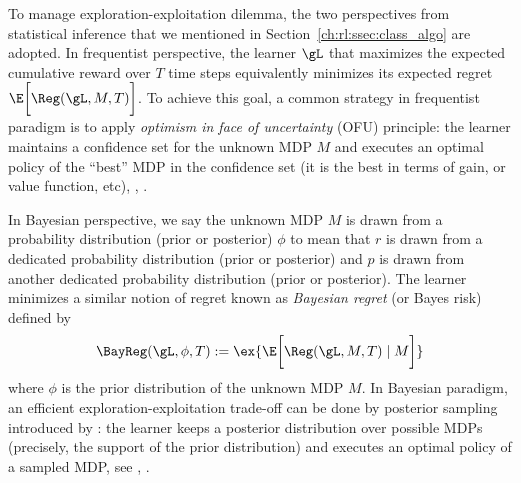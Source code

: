 To manage exploration-exploitation dilemma, the two perspectives from statistical inference that we mentioned in Section~\ref{ch:rl:ssec:class_algo} are adopted. %
In frequentist perspective, the learner $\gL$ that maximizes the expected cumulative reward over $T$ time steps equivalently minimizes its expected regret $\E\bigg[\Reg(\gL, M, T)\bigg]$.
To achieve this goal, a common strategy in frequentist paradigm is to apply \emph{optimism in face of uncertainty} (OFU) principle: the learner maintains a confidence set for the unknown MDP $M$ and executes an optimal policy of the
“best” MDP in the confidence set (it is the best in terms of gain, or value function, etc), \eg, \cite{jaksch2010near, filippi2010optimism, bartlett2012regal, azar2017minimax, fruit2017regret, jin2018q, fruit2018efficient, fruit2018near, zanette2019tighter, zhang2019regret, bourel2020tightening, ortner2020regret}.

In Bayesian perspective, we say the unknown MDP $M$ is drawn from a probability distribution (prior or posterior) $\phi$ to mean that $r$ is drawn from a dedicated probability distribution (prior or posterior) and $p$ is drawn from another dedicated probability distribution (prior or posterior).
The learner minimizes a similar notion of regret known as \emph{Bayesian regret} (or Bayes risk) defined by
\begin{equation}
    \label{eq:bayes_rg}
    \BayReg(\gL, \phi, T):=\ex{\E\bigg[\Reg(\gL, M, T) \mid M\bigg]}
\end{equation}
where $\phi$ is the prior distribution of the unknown MDP $M$.
In Bayesian paradigm, an efficient exploration-exploitation trade-off can be done by posterior sampling introduced by \cite{thompson1933likelihood}: the learner keeps a posterior distribution over possible MDPs (precisely, the support of the prior distribution) and executes an optimal policy of a sampled MDP, see \eg, \cite{osband2013more, gopalan2015thompson, ouyang2017learning}.

